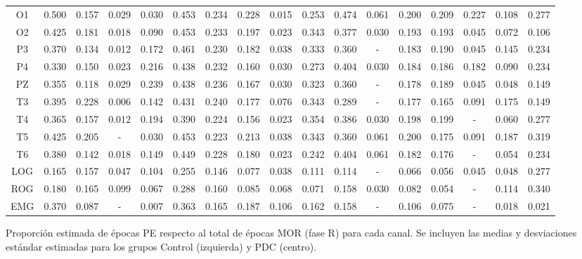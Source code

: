 \begin{SidewaysFigure}
\begin{tabular}{c||ccccc|cc||cccc|cc||ccc}
 O1 & 0.500    & 0.157    & 0.029    & 0.030    & 0.453    & 0.234    & 0.228    & 0.015    & 0.253    & 0.474    & 0.061    & 0.200    & 0.209    & 0.227    & 0.108    & 0.277     \\
 O2 & 0.425    & 0.181    & 0.018    & 0.090    & 0.453    & 0.233    & 0.197    & 0.023    & 0.343    & 0.377    & 0.030    & 0.193    & 0.193    & 0.045    & 0.072    & 0.106     \\
 P3 & 0.370    & 0.134    & 0.012    & 0.172    & 0.461    & 0.230    & 0.182    & 0.038    & 0.333    & 0.360    & -      & 0.183    & 0.190    & 0.045    & 0.145    & 0.234     \\
 P4 & 0.330    & 0.150    & 0.023    & 0.216    & 0.438    & 0.232    & 0.160    & 0.030    & 0.273    & 0.404    & 0.030    & 0.184    & 0.186    & 0.182    & 0.090    & 0.234     \\
 PZ & 0.355    & 0.118    & 0.029    & 0.239    & 0.438    & 0.236    & 0.167    & 0.030    & 0.323    & 0.360    & -      & 0.178    & 0.189    & 0.045    & 0.048    & 0.149     \\
 T3 & 0.395    & 0.228    & 0.006    & 0.142    & 0.431    & 0.240    & 0.177    & 0.076    & 0.343    & 0.289    & -      & 0.177    & 0.165    & 0.091    & 0.175    & 0.149     \\
 T4 & 0.365    & 0.157    & 0.012    & 0.194    & 0.390    & 0.224    & 0.156    & 0.023    & 0.354    & 0.386    & 0.030    & 0.198    & 0.199    & -      & 0.060    & 0.277     \\
 T5 & 0.425    & 0.205    & -      & 0.030    & 0.453    & 0.223    & 0.213    & 0.038    & 0.343    & 0.360    & 0.061    & 0.200    & 0.175    & 0.091    & 0.187    & 0.319     \\
 T6 & 0.380    & 0.142    & 0.018    & 0.149    & 0.449    & 0.228    & 0.180    & 0.023    & 0.242    & 0.404    & 0.061    & 0.182    & 0.176    & -      & 0.054    & 0.234     \\
 LOG & 0.165    & 0.157    & 0.047    & 0.104    & 0.255    & 0.146    & 0.077    & 0.038    & 0.111    & 0.114    & -      & 0.066    & 0.056    & 0.045    & 0.048    & 0.277     \\
 ROG & 0.180    & 0.165    & 0.099    & 0.067    & 0.288    & 0.160    & 0.085    & 0.068    & 0.071    & 0.158    & 0.030    & 0.082    & 0.054    & -      & 0.114    & 0.340     \\
 EMG & 0.370    & 0.087    & -      & 0.007    & 0.363    & 0.165    & 0.187    & 0.106    & 0.162    & 0.158    & -      & 0.106    & 0.075    & -      & 0.018    & 0.021    
\end{tabular}
\caption{Proporci\'on estimada de \'epocas PE respecto al total de \'epocas MOR 
(fase R) para cada
canal. Se incluyen las medias y desviaciones est\'andar estimadas para los grupos 
Control (izquierda) y PDC (centro).}
\label{gpos_mor}
\end{SidewaysFigure}

